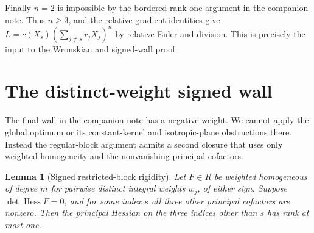 \documentclass[11pt,a4paper]{article}
\newtheorem{lemma}{Lemma}
\newcommand{\Hess}{\operatorname{Hess}}
\begin{document}
Finally $n=2$ is impossible by the bordered-rank-one argument in the companion note. Thus $n\ge3$, and the relative gradient identities give $L=c(X_s)(\sum_{j\ne s}r_j X_j)^n$ by relative Euler and division. This is precisely the input to the Wronskian and signed-wall proof.

\section{The distinct-weight signed wall}
The final wall in the companion note has a negative weight. We cannot apply the global optimum or its constant-kernel and isotropic-plane obstructions there. Instead the regular-block argument admits a second closure that uses only weighted homogeneity and the nonvanishing principal cofactors.

\begin{lemma}[Signed restricted-block rigidity]\label{lem:signed}
Let $F\in R$ be weighted homogeneous of degree $m$ for pairwise distinct integral weights $w_j$, of either sign. Suppose $\det\Hess F=0$, and for some index $s$ all three other principal cofactors are nonzero. Then the principal Hessian on the three indices other than $s$ has rank at most one.
\end{lemma}
\end{document}
